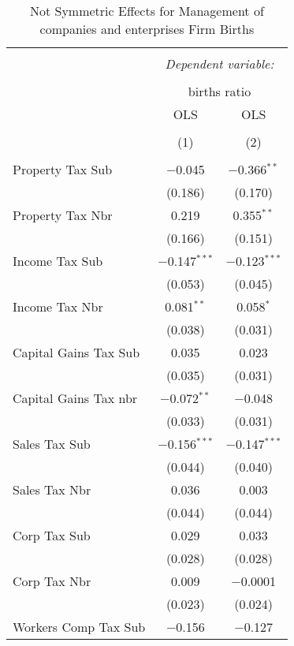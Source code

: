 
\begin{table}[!htbp] \centering 
  \caption{Not Symmetric Effects for  Management of companies and enterprises Firm Births} 
  \label{55noequality} 
\footnotesize 
\begin{tabular}{@{\extracolsep{5pt}}lcc} 
\\[-1.8ex]\hline 
\hline \\[-1.8ex] 
 & \multicolumn{2}{c}{\textit{Dependent variable:}} \\ 
\cline{2-3} 
\\[-1.8ex] & \multicolumn{2}{c}{births ratio} \\ 
 & OLS & OLS \\ 
\\[-1.8ex] & (1) & (2)\\ 
\hline \\[-1.8ex] 
 Property Tax Sub & $-$0.045 & $-$0.366$^{**}$ \\ 
  & (0.186) & (0.170) \\ 
  Property Tax Nbr & 0.219 & 0.355$^{**}$ \\ 
  & (0.166) & (0.151) \\ 
  Income Tax Sub & $-$0.147$^{***}$ & $-$0.123$^{***}$ \\ 
  & (0.053) & (0.045) \\ 
  Income Tax Nbr & 0.081$^{**}$ & 0.058$^{*}$ \\ 
  & (0.038) & (0.031) \\ 
  Capital Gains Tax Sub & 0.035 & 0.023 \\ 
  & (0.035) & (0.031) \\ 
  Capital Gains Tax nbr & $-$0.072$^{**}$ & $-$0.048 \\ 
  & (0.033) & (0.031) \\ 
  Sales Tax Sub & $-$0.156$^{***}$ & $-$0.147$^{***}$ \\ 
  & (0.044) & (0.040) \\ 
  Sales Tax Nbr & 0.036 & 0.003 \\ 
  & (0.044) & (0.044) \\ 
  Corp Tax Sub & 0.029 & 0.033 \\ 
  & (0.028) & (0.028) \\ 
  Corp Tax Nbr & 0.009 & $-$0.0001 \\ 
  & (0.023) & (0.024) \\ 
  Workers Comp Tax Sub & $-$0.156 & $-$0.127 \\ 

\end{tabular}
\end{table}
